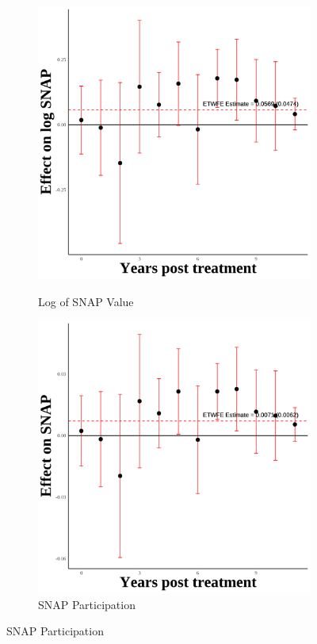 \documentclass[12pt,english]{article}
\begin{document}
\begin{figure}[H]
  \vspace{0.3cm} %

  \begin{subfigure}[b]{0.3\textwidth}
    \centering
    \caption{Log of SNAP Value}
    \includegraphics[width=\linewidth]{figures/plot76-ln_snap_event_study-third-three.png}
    \label{fig:ln-snap-third-three}
  \end{subfigure}
  \hfill
  \begin{subfigure}[b]{0.3\textwidth}
    \centering
    \caption{SNAP Participation}
    \includegraphics[width=\linewidth]{figures/plot77-snap_event_study-third-three.png}

\end{subfigure}
\end{figure}
\end{document}
